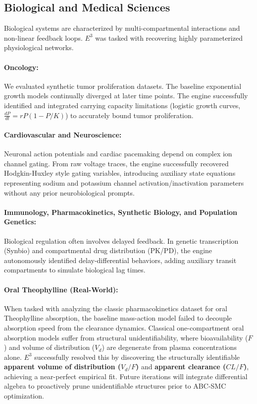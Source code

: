\subsection{Biological and Medical Sciences}

Biological systems are characterized by multi-compartmental interactions and non-linear feedback loops. $E^3$ was tasked with recovering highly parameterized physiological networks.

\paragraph{Oncology:} We evaluated synthetic tumor proliferation datasets. The baseline exponential growth models continually diverged at later time points. The engine successfully identified and integrated carrying capacity limitations (logistic growth curves, $\frac{dP}{dt} = rP(1 - P/K)$) to accurately bound tumor proliferation.
\paragraph{Cardiovascular and Neuroscience:} Neuronal action potentials and cardiac pacemaking depend on complex ion channel gating. From raw voltage traces, the engine successfully recovered Hodgkin-Huxley style gating variables, introducing auxiliary state equations representing sodium and potassium channel activation/inactivation parameters without any prior neurobiological prompts.
\paragraph{Immunology, Pharmacokinetics, Synthetic Biology, and Population Genetics:} Biological regulation often involves delayed feedback. In genetic transcription (Synbio) and compartmental drug distribution (PK/PD), the engine autonomously identified delay-differential behaviors, adding auxiliary transit compartments to simulate biological lag times.
\paragraph{Oral Theophylline (Real-World):} When tasked with analyzing the classic pharmacokinetics dataset for oral Theophylline absorption, the baseline mass-action model failed to decouple absorption speed from the clearance dynamics. Classical one-compartment oral absorption models suffer from structural unidentifiability, where bioavailability ($F$) and volume of distribution ($V_d$) are degenerate from plasma concentrations alone. $E^3$ successfully resolved this by discovering the structurally identifiable \textbf{apparent volume of distribution ($V_d/F$)} and \textbf{apparent clearance ($CL/F$)}, achieving a near-perfect empirical fit. Future iterations will integrate differential algebra to proactively prune unidentifiable structures prior to ABC-SMC optimization.
